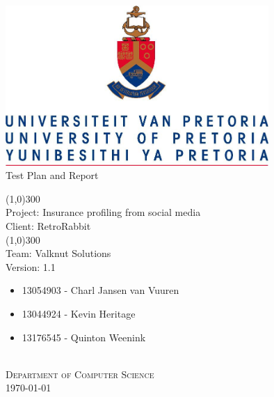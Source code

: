 \documentclass{article}
\begin{document}
	\begin{titlepage}
		\begin{center}
			\includegraphics[width=10cm]{images/UP.jpg}  \\
			[0.5cm]
			\huge{
			Test Plan and Report\\
			}
			
			\line(1,0){300}\\
			[0.2cm]
			\LARGE{Project: Insurance profiling from social media\\
			Client: RetroRabbit} \\
			\line(1,0){300}\\
			\LARGE{Team: Valknut Solutions}\\
			[1.0cm]
			\large{Version: 1.1}\\
			[1.0cm]
			\large
			{
			\begin{itemize}
				\item 13054903 - Charl Jansen van Vuuren    
				\item 13044924 - Kevin Heritage
				\item 13176545 - Quinton Weenink\\
			\end{itemize}
			}
			\textsc{\large}\\
		[3.0cm]
		\textsc{\large  Department of Computer Science}\\
		[0.5cm]
		\textsc{\large \today}\\
		\end{center}
	\end{titlepage}
	
	\cleardoublepage
	\begin{versionhistory}
	\end{versionhistory}	
	
\end{document}
